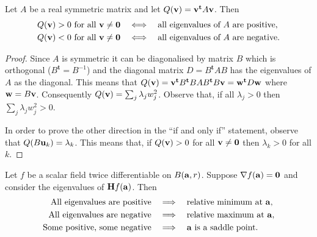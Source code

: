\begin{theorem}
    Let \(A\) be a real symmetric matrix and let
    \(Q(\vv) =  \vv^{\mathbf{t}} A  \vv  \).
    Then
    \[
        \begin{aligned}
            \text{\(Q(\vv) > 0\) for all \(\vv \neq \mathbf{0}\)}
             & \quad \Longleftrightarrow \quad 
            \text{all eigenvalues of \(A\) are positive}, \\
            \text{\(Q(\vv) < 0\) for all \(\vv \neq \mathbf{0}\)}
             & \quad \Longleftrightarrow \quad
            \text{all eigenvalues of \(A\) are negative}.
        \end{aligned}
    \]
\end{theorem}

\begin{proof}
    Since \(A\) is symmetric it can be diagonalised by  matrix \(B\)  which is orthogonal (\(B^{\mathbf{t}}=B^{-1}\))
    and the diagonal matrix \(D = B^{\mathbf{t}} A B\) has the eigenvalues of \(A\) as the diagonal.
    This means that
    \(Q(\vv) = \vv^{\mathbf{t}} B^{\mathbf{t}} B A B^{\mathbf{t}} B \vv = \ww^{\mathbf{t}} D \ww \)
    where \(\ww = B \vv\).
    Consequently \(Q(\vv) =  \sum_{j} \lambda_j w_j^2\).
    Observe that, if all \(\lambda_j >0\) then \( \sum_{j} \lambda_j w_j^2  >0\).

    In order to prove the other direction in the ``if and only if'' statement, observe that \(Q(B \uu_k ) = \lambda_k\). This means that, if \(Q(\vv) > 0\) for all \(\vv \neq \mathbf{0}\) then \(\lambda_k>0\) for all \(k\).
\end{proof}

\begin{theorem}
    Let \(f\) be a scalar field twice differentiable on \(B(\aa,r)\).
    Suppose  \(\nabla f(\aa) = \mathbf{0}\) and consider the eigenvalues of  \(\mathbf{H} f (\aa)\). 
    Then
    \[
        \begin{aligned}
            \text{{All} eigenvalues are positive}
             & \quad \Longrightarrow \quad 
            \text{relative minimum at \(\aa\)}, \\
            \text{{All} eigenvalues are negative}
             & \quad \Longrightarrow \quad 
            \text{relative maximum at \(\aa\)}, \\
            \text{Some positive, some negative}
             & \quad \Longrightarrow \quad 
            \text{\(\aa\) is a saddle point}.
        \end{aligned}
    \]
\end{theorem}

